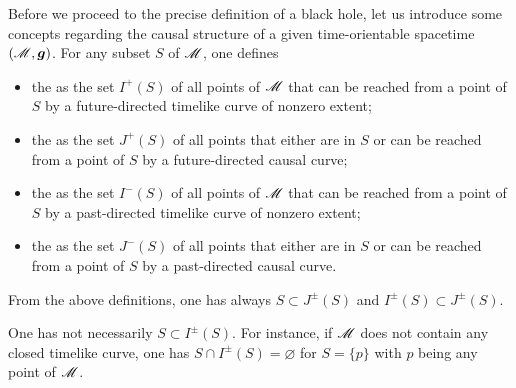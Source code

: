 Before we proceed to the precise definition of a black hole, let us introduce
some concepts regarding the causal structure of a given time-orientable spacetime $(\mathscr{M},\bm{g})$.
For any subset $S$ of $\mathscr{M}$, one defines
\begin{itemize}
\item the  as the set $I^+(S)$ of all
points of $\mathscr{M}$ that can be reached from a point of $S$ by a future-directed
timelike curve of nonzero extent;
\item the  as the set $J^+(S)$ of
all points that either are in $S$ or can be reached from a point of $S$ by a future-directed
causal curve;
\item the  as the set $I^-(S)$ of all
points of $\mathscr{M}$ that can be reached from a point of $S$ by a past-directed
timelike curve of nonzero extent;
\item the  as the set $J^-(S)$ of
all points that either are in $S$ or can be reached from a point of $S$ by a past-directed
causal curve.
\end{itemize}
From the above definitions, one has always $S \subset J^\pm(S)$ and
$I^\pm(S) \subset J^\pm(S)$.

\begin{remark}
One has not necessarily $S \subset I^\pm(S)$. For instance,
if $\mathscr{M}$ does not contain
any closed timelike curve, one has  $S \cap I^\pm(S) = \varnothing$ for
$S = \{p\}$ with $p$ being any point of $\mathscr{M}$.
\end{remark}


